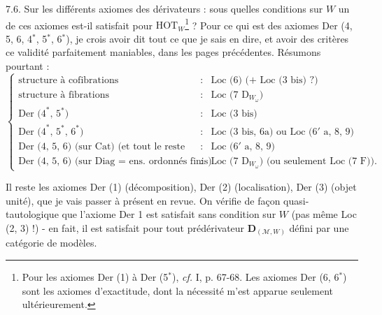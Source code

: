 7.6. Sur les différents axiomes des dérivateurs : sous quelles conditions sur $W$ un de ces axiomes est-il satisfait pour $\mathrm{HOT}_W$\footnote[51]{Pour les axiomes Der (1) à Der (5$^*$), \textit{cf.} I, p. 67-68. Les axiomes Der (6, 6$^*$) sont les axiomes d'exactitude, dont la nécessité m'est apparue seulement ultérieurement.} ? Pour ce qui est des axiomes Der (4, 5, 6, 4$^*$, 5$^*$, 6$^*$), je crois avoir dit tout ce que je sais en dire, et avoir des critères ce validité parfaitement maniables, dans les pages précédentes. Résumons pourtant : %
\[
\left\{
\begin{array}{lcl}
\text{structure à cofibrations} & : & \text{Loc (6) (+ Loc (3 bis) ?)} \\[1ex]
\text{structure à fibrations} & : & \text{Loc (7 }\mathrm{D}_{W_\omega}\text{)} \\[1ex]
\text{Der (4}^*\text{, 5}^*\text{)} & : & \text{Loc (3 bis)} \\[1ex]
\text{Der (4}^*\text{, 5}^*\text{, 6}^*\text{)} & : & \text{Loc (3 bis, 6a) ou Loc (6}'\text{ a, 8, 9)} \\[1ex]
\text{Der (4, 5, 6) (sur Cat) (et tout le reste !)} & : & \text{Loc (6}'\text{ a, 8, 9)} \\[1ex]
\text{Der (4, 5, 6) (sur Diag $=$ ens. ordonnés finis)} & : & \text{Loc (7 }\mathrm{D}_{W_\omega}\text{) (ou seulement Loc (7 F)).}
\end{array}
\right.
\]

Il reste les axiomes Der (1) (décomposition), Der (2) (localisation), Der (3) (objet unité), que je vais passer à présent en revue. On vérifie
de façon quasi-tautologique que l'axiome Der 1 est satisfait sans condition sur $W$ (pas même Loc (2, 3) !) - en fait, il est satisfait pour tout prédérivateur $\mathbf{D}_{(\mathcal{M},W)}$ défini par une catégorie de modèles.

